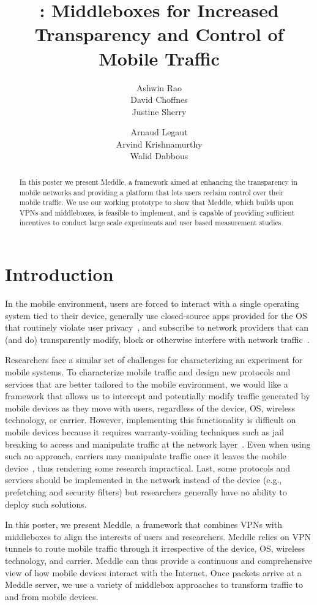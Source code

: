 \documentclass{sig-alternate-10pt}
\title{\meddle: Middleboxes for Increased Transparency and Control of
  Mobile Traffic\vspace{-0.2in}}
\author{
\alignauthor
Ashwin Rao\\
\affaddr{INRIA}
\alignauthor        
David Choffnes\\
\affaddr{University of Washington}
\alignauthor
Justine Sherry\\
\affaddr{UC Berkeley}
\and
\alignauthor
Arnaud Legaut\\
\affaddr{INRIA}
\alignauthor 
Arvind Krishnamurthy\\
\affaddr{University of Washington}
\alignauthor
Walid Dabbous\\
\affaddr{INRIA}
}
\date{}
\newcommand{\meddle}{{Meddle}\xspace}
\begin{document}
	
\maketitle

\begin{abstract}
In this poster we present \meddle, a framework aimed at enhancing
the transparency in mobile networks and providing a platform that lets
users reclaim control over their mobile traffic. We use our working
prototype to show that \meddle, which builds upon VPNs and
middleboxes, is feasible to implement, and is capable of providing
sufficient incentives to conduct large scale experiments and user
based measurement studies.
\end{abstract}

\section{Introduction}

In the mobile environment, users are forced to interact with a single
operating system tied to their device, generally use closed-source
apps provided for the OS that routinely violate user
privacy~\cite{hornyack:appfence}, and subscribe to network providers
that can (and do) transparently modify, block or otherwise interfere
with network traffic~\cite{wang:middleboxes}. 

Researchers face a similar set of challenges for characterizing an
experiment for mobile systems. To characterize mobile traffic and
design new protocols and services that are better tailored to the
mobile environment, we would like a framework that allows us to
intercept and potentially modify traffic generated by mobile devices
as they move with users, regardless of the device, OS, wireless
technology, or carrier. However, implementing this functionality is
difficult on mobile devices because it requires warranty-voiding
techniques such as jail breaking to access and manipulate traffic at
the network layer~\cite{enck:taintdroid}. Even when using such an
approach, carriers may manipulate traffic once it leaves the mobile
device~\cite{wang:middleboxes}, thus rendering some research
impractical. Last, some protocols and services should be implemented
in the network instead of the device (e.g., prefetching and security
filters) but researchers generally have no ability to deploy such
solutions.

In this poster, we present \meddle, a framework that combines
VPNs with middleboxes to align the interests of users and
researchers. \meddle relies on VPN tunnels to route mobile traffic
through it irrespective of the device, OS, wireless technology, and
carrier. \meddle can thus provide a continuous and
comprehensive view of how mobile devices interact with the
Internet. Once packets arrive at a \meddle server, we use a variety of
middlebox approaches to transform traffic to and from mobile devices.
\end{document}
